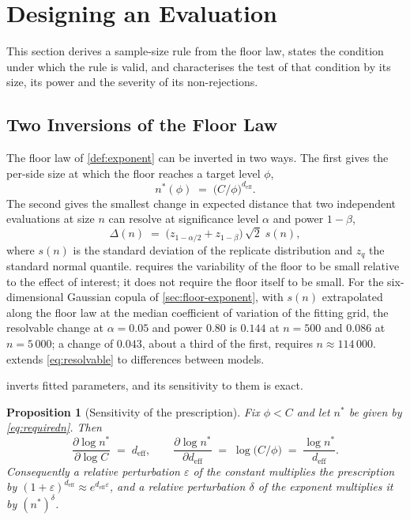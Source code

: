 \documentclass[twoside,11pt]{article}
\theoremstyle{plain}
\newtheorem{prop}{Proposition}
\theoremstyle{definition}
\theoremstyle{remark}
\newcommand{\deff}{\ensuremath{d_{\mathrm{eff}}}}
\begin{document}
\section{Designing an Evaluation}\label{sec:sizing}

This section derives a sample-size rule from the floor law, states the
condition under which the rule is valid, and characterises the test of that
condition by its size, its power and the severity of its non-rejections.

\subsection{Two Inversions of the Floor Law}\label{sec:sizing-law}

The floor law of \cref{def:exponent} can be inverted in two ways. The
first gives the per-side size at which the floor reaches a target level
$\phi$,
\begin{equation}\label{eq:requiredn}
  n^{*}(\phi) \;=\; \bigl(C/\phi\bigr)^{\deff}.
\end{equation}
The second gives the smallest change in expected distance that two
independent evaluations at size $n$ can resolve at significance level
$\alpha$ and power $1-\beta$,
\begin{equation}\label{eq:resolvable}
  \Delta(n) \;=\;
  \bigl(z_{1-\alpha/2} + z_{1-\beta}\bigr)\, \sqrt{2}\; s(n),
\end{equation}
where $s(n)$ is the standard deviation of the replicate distribution and
$z_q$ the standard normal quantile.  requires the
variability of the floor to be small relative to the effect of interest; it
does not require the floor itself to be small. For the six-dimensional
Gaussian copula of \cref{sec:floor-exponent}, with $s(n)$ extrapolated along
the floor law at the median coefficient of variation of the fitting grid,
the resolvable change at $\alpha = 0.05$ and power $0.80$ is $0.144$ at
$n = 500$ and $0.086$ at $n = 5\,000$; a change of $0.043$, about a third of the
first, requires $n \approx 114\,000$.  extends
\cref{eq:resolvable} to differences between models.

 inverts fitted parameters, and its sensitivity to them
is exact.

\begin{prop}[Sensitivity of the prescription]\label{prop:inversion}
Fix $\phi < C$ and let $n^{*}$ be given by \cref{eq:requiredn}. Then
\[
  \frac{\partial \log n^{*}}{\partial \log C} \;=\; \deff,
  \qquad
  \frac{\partial \log n^{*}}{\partial \deff}
  \;=\; \log\!\bigl(C/\phi\bigr) \;=\; \frac{\log n^{*}}{\deff} .
\]
Consequently a relative perturbation $\varepsilon$ of the constant
multiplies the prescription by $(1+\varepsilon)^{\deff} \approx
e^{\deff \varepsilon}$, and a relative perturbation $\delta$ of the
exponent multiplies it by $(n^{*})^{\delta}$.
\end{prop}
\end{document}
